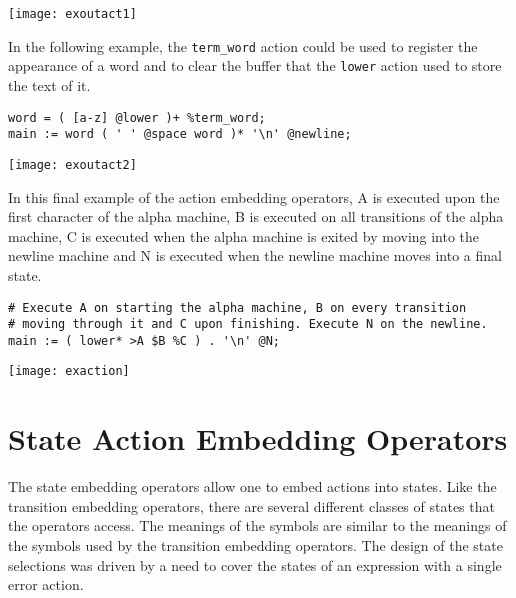 \documentclass[letterpaper,11pt,oneside]{book}
\newcommand{\graphspace}{\vspace{10pt}}
\newenvironment{inline_code}{\def\baselinestretch{1}\vspace{12pt}\small}{}
\begin{document}
\graphspace
\begin{center}
\texttt{[image: exoutact1]}
\end{center}
\graphspace

In the following example, the \verb|term_word| action could be used to register
the appearance of a word and to clear the buffer that the \verb|lower| action used
to store the text of it.

\begin{inline_code}
\begin{verbatim}
word = ( [a-z] @lower )+ %term_word;
main := word ( ' ' @space word )* '\n' @newline;
\end{verbatim}
\end{inline_code}

\graphspace
\begin{center}
\texttt{[image: exoutact2]}
\end{center}
\graphspace


In this final example of the action embedding operators, A is executed upon the
first character of the alpha machine, B is executed on all transitions of the
alpha machine, C is executed when the alpha machine is exited by moving into the
newline machine and N is executed when the newline machine moves into a final
state.  

\begin{inline_code}
\begin{verbatim}
# Execute A on starting the alpha machine, B on every transition 
# moving through it and C upon finishing. Execute N on the newline.
main := ( lower* >A $B %C ) . '\n' @N;
\end{verbatim}
\end{inline_code}

\graphspace
\begin{center}
\texttt{[image: exaction]}
\end{center}
\graphspace


\section{State Action Embedding Operators}

The state embedding operators allow one to embed actions into states. Like the
transition embedding operators, there are several different classes of states
that the operators access. The meanings of the symbols are similar to the
meanings of the symbols used by the transition embedding operators. The design
of the state selections was driven by a need to cover the states of an
expression with a single error action.
\end{document}
